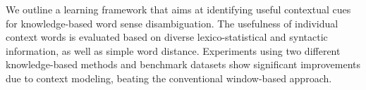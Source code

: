 We outline a learning framework that aims at identifying useful contextual cues for knowledge-based word sense disambiguation. The usefulness of individual context words is evaluated based on diverse lexico-statistical and syntactic information, as well as simple word distance. Experiments using two different knowledge-based methods and benchmark datasets show significant improvements due to context modeling, beating the conventional window-based approach.
